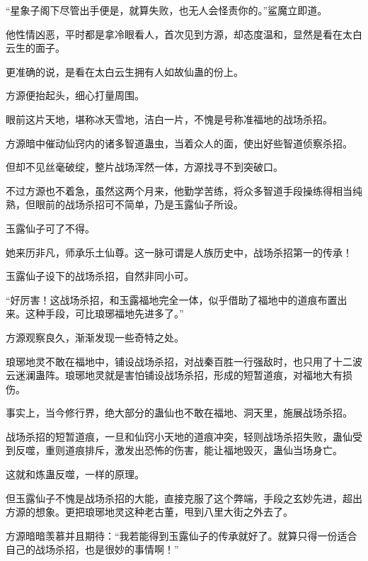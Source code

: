 \begin{this_body}
“星象子阁下尽管出手便是，就算失败，也无人会怪责你的。”鲨魔立即道。

他性情凶恶，平时都是拿冷眼看人，首次见到方源，却态度温和，显然是看在太白云生的面子。

更准确的说，是看在太白云生拥有人如故仙蛊的份上。

方源便抬起头，细心打量周围。

眼前这片天地，堪称冰天雪地，洁白一片，不愧是号称准福地的战场杀招。

方源暗中催动仙窍内的诸多智道蛊虫，当着众人的面，使出好些智道侦察杀招。

但却不见丝毫破绽，整片战场浑然一体，方源找寻不到突破口。

不过方源也不着急，虽然这两个月来，他勤学苦练，将众多智道手段操练得相当纯熟，但眼前的战场杀招可不简单，乃是玉露仙子所设。

玉露仙子可了不得。

她来历非凡，师承乐土仙尊。这一脉可谓是人族历史中，战场杀招第一的传承！

玉露仙子设下的战场杀招，自然非同小可。

“好厉害！这战场杀招，和玉露福地完全一体，似乎借助了福地中的道痕布置出来。这种手段，可比琅琊福地先进多了。”

方源观察良久，渐渐发现一些奇特之处。

琅琊地灵不敢在福地中，铺设战场杀招，对战秦百胜一行强敌时，也只用了十二波云迷澜蛊阵。琅琊地灵就是害怕铺设战场杀招，形成的短暂道痕，对福地大有损伤。

事实上，当今修行界，绝大部分的蛊仙也不敢在福地、洞天里，施展战场杀招。

战场杀招的短暂道痕，一旦和仙窍小天地的道痕冲突，轻则战场杀招失败，蛊仙受到反噬，重则道痕排斥，激发出恐怖的伤害，能让福地毁灭，蛊仙当场身亡。

这就和炼蛊反噬，一样的原理。

但玉露仙子不愧是战场杀招的大能，直接克服了这个弊端，手段之玄妙先进，超出方源的想象。更把琅琊地灵这种老古董，甩到八里大街之外去了。

方源暗暗羡慕并且期待：“我若能得到玉露仙子的传承就好了。就算只得一份适合自己的战场杀招，也是很妙的事情啊！”

\end{this_body}


